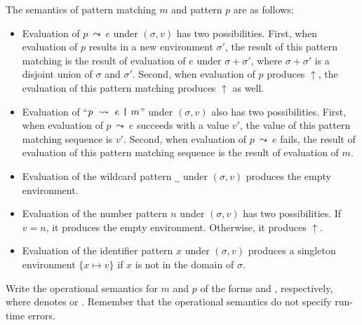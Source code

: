 \begin{enumerate}
The semantics of pattern matching $m$ and pattern $p$ are as follows:
\begin{itemize}
\item Evaluation of $p\ \leadsto\ e$ under $(\sigma, v)$ has two possibilities.
First, when evaluation of $p$ results in a new environment $\sigma'$,
the result of this pattern matching is the result of evaluation of $e$ under $\sigma+\sigma'$,
where $\sigma+\sigma'$ is a disjoint union of $\sigma$ and $\sigma'$.
Second, when evaluation of $p$ produces $\uparrow$,
the evaluation of this pattern matching produces $\uparrow$ as well.
\item Evaluation of ``$p\ \leadsto\ e\ \verb!|!\ m$'' under $(\sigma, v)$
also has two possibilities.
First, when evaluation of $p\ \leadsto\ e$ succeeds with a value $v'$,
the value of this pattern matching sequence is $v'$.
Second, when evaluation of $p\ \leadsto\ e$ fails,
the result of evaluation of this pattern matching sequence is
the result of evaluation of $m$.
\item Evaluation of the wildcard pattern \verb!_! under $(\sigma, v)$
produces the empty environment.
\item Evaluation of the number pattern $n$ under $(\sigma, v)$ has two possibilities.
If $v=n$,
it produces the empty environment.  Otherwise, it produces $\uparrow$.
\item Evaluation of the identifier pattern $x$ under $(\sigma, v)$
produces a singleton environment $\{x \mapsto v\}$
if $x$ is not in the domain of $\sigma$.
\end{itemize}
Write the operational semantics for $m$ and $p$
of the forms  and
, respectively,
where  denotes
 or
.
Remember that the operational semantics do not specify run-time errors.
\end{enumerate}
